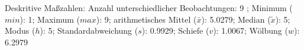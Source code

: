 				\label{tableValues:bsch14b}
				\vspace*{-\baselineskip}
                    \begin{noten}
                	    \note{} Deskritive Maßzahlen:
                	    Anzahl unterschiedlicher Beobachtungen: 9%
                	    ; 
                	      Minimum ($min$): 1; 
                	      Maximum ($max$): 9; 
                	      arithmetisches Mittel ($\bar{x}$): \num[round-mode=places,round-precision=2]{5,0279}; 
                	      Median ($\tilde{x}$): 5; 
                	      Modus ($h$): 5; 
                	      Standardabweichung ($s$): \num[round-mode=places,round-precision=2]{0,9929}; 
                	      Schiefe ($v$): \num[round-mode=places,round-precision=2]{1,0067}; 
                	      Wölbung ($w$): \num[round-mode=places,round-precision=2]{6,2979}
                     \end{noten}


